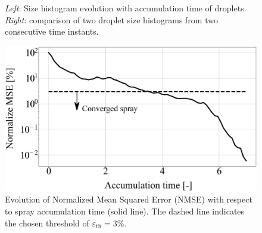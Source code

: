 \begin{figure}[ht]
     \centering
     \begin{subfigure}[b]{0.45\textwidth}
         \centering
     \end{subfigure}
     \begin{subfigure}[b]{0.45\textwidth}
         \centering
     \end{subfigure}
        \caption{\textsl{Left}: Size histogram evolution with accumulation time of droplets. \textsl{Right}: comparison of two droplet size histograms from two consecutive time instants.}
        \label{fig:spray_convergence_description_accumulation_and_MSE_comparison}
\end{figure}



\begin{figure}[h!]
	\centering
	\includegraphics[scale=0.15]{./part2_developments/figures_ch4_SLI/spray_convergence_with_text.eps}
	\caption[Evolution of Normalized Mean Squared Error (NMSE) with respect to spray accumulation time.]{Evolution of Normalized Mean Squared Error (NMSE) with respect to spray accumulation time (solid line). The dashed line indicates the chosen threshold of $\varepsilon_\mathrm{th} = 3 \%$.}
	\label{fig:NMSE_evolution}
\end{figure}



